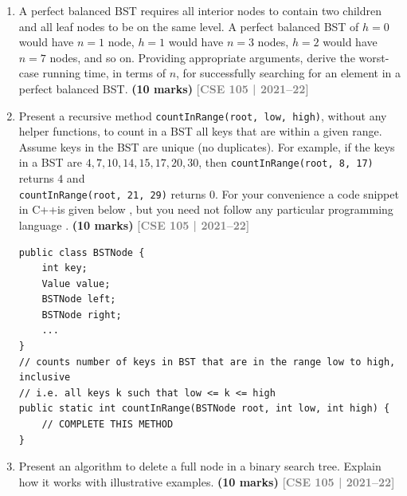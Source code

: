 \documentclass[12pt,a3paper]{article}
\newcommand{\yr}[1]{\hfill\textcolor{gray}{\small\textbf{[#1]}}}
\newcommand{\mk}[1]{\textcolor{orange!70!black}{\small\textbf{(#1 marks)}}}
\begin{document}
\begin{enumerate}
\item A perfect balanced BST requires all interior nodes to contain two children and all leaf nodes to be on the same level. A perfect balanced BST of $h = 0$ would have $n = 1$ node, $h = 1$ would have $n = 3$ nodes, $h = 2$ would have $n = 7$ nodes, and so on. Providing appropriate arguments, derive the worst-case running time, in terms of $n$, for successfully searching for an element in a perfect balanced BST. \mk{10}
\yr{CSE 105 | 2021--22}


\item Present a recursive method \texttt{countInRange(root, low, high)}, without any helper functions, to count in a BST all keys that are within a given range. Assume keys in the BST are unique (no duplicates). For example, if the keys in a BST are $4, 7, 10, 14, 15, 17, 20, 30$, then \texttt{countInRange(root, 8, 17)} returns $4$ and \\\texttt{countInRange(root, 21, 29)} returns $0$.
For your convenience a code snippet in C++is given below , but you need not follow any particular programming language . \mk{10}
\yr{CSE 105 | 2021--22}

\begin{lstlisting}[style=javastyle]
public class BSTNode {
    int key;
    Value value;
    BSTNode left;
    BSTNode right;
    ...
}
// counts number of keys in BST that are in the range low to high, inclusive
// i.e. all keys k such that low <= k <= high
public static int countInRange(BSTNode root, int low, int high) {
    // COMPLETE THIS METHOD
}
\end{lstlisting}


\item Present an algorithm to delete a full node in a binary search tree. Explain how it works with illustrative examples. \mk{10}
\yr{CSE 105 | 2021--22}


\end{enumerate}
\end{document}

